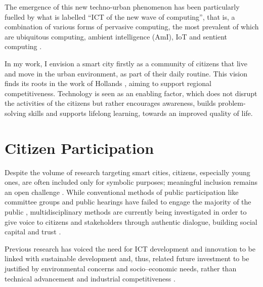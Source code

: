 The emergence of this new techno-urban phenomenon has been particularly fuelled by what is labelled \enquote{ICT of the new wave of computing}, that is, a combination of various forms of pervasive computing, the most prevalent of which are ubiquitous computing, ambient intelligence (AmI), IoT and sentient computing \autocite{bibri_social_2017}.

In my work, I envision a smart city firstly as a community of citizens that live and move in the urban environment, as part of their daily routine. This vision finds its roots in the work of Hollands \autocite*{hollands_will_2008}, aiming to support regional competitiveness. Technology is seen as an enabling factor, which does not disrupt the activities of the citizens but rather encourages awareness, builds problem-solving skills and supports lifelong learning, towards an improved quality of life.


\section{Citizen Participation}

Despite the volume of research targeting smart cities, citizens, especially young ones, are often included only for symbolic purposes; meaningful inclusion remains an open challenge \autocite{lansdown_realisation_2010}. While conventional methods of public participation like committee groups and public hearings have failed to engage the majority of the public \autocites{roberts_public_2004}{irvin_citizen_2004}, multidisciplinary methods are currently being investigated in order to give voice to citizens and stakeholders through authentic dialogue, building social capital and trust \autocite{innes_reframing_2004}.

Previous research has voiced the need for ICT development and innovation to be linked with sustainable development and, thus, related future investment to be justified by environmental concerns and socio–economic needs, rather than technical advancement and industrial competitiveness \autocite{bibri_smart_2017}.

